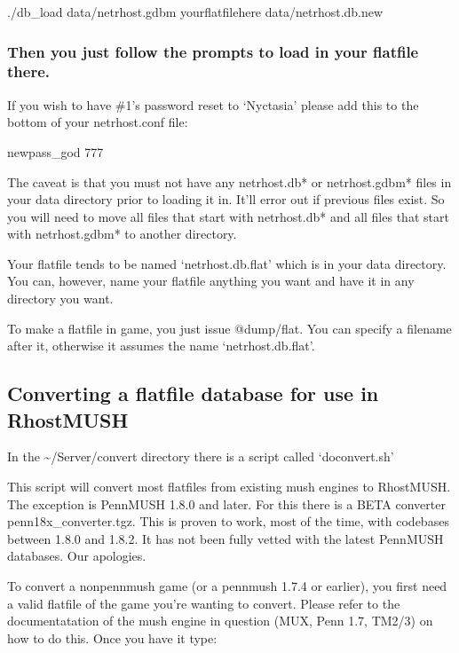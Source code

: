 \documentclass[letterpaper,10pt,english]{sphinxmanual}
\begin{document}
\sphinxAtStartPar
./db\_load data/netrhost.gdbm yourflatfilehere data/netrhost.db.new


\subsubsection{Then you just follow the prompts to load in your flatfile there.}
\label{\detokenize{database:then-you-just-follow-the-prompts-to-load-in-your-flatfile-there}}
\sphinxAtStartPar
If you wish to have \#1’s password reset to ‘Nyctasia’ please add this
to the bottom of your netrhost.conf file:

\sphinxAtStartPar
newpass\_god 777

\sphinxAtStartPar
The caveat is that you must not have any netrhost.db* or netrhost.gdbm* files
in your data directory prior to loading it in.  It’ll error out if previous
files exist.  So you will need to move all files that start with netrhost.db*
and all files that start with netrhost.gdbm* to another directory.

\sphinxAtStartPar
Your flatfile tends to be named ‘netrhost.db.flat’ which is in your data
directory.  You can, however, name your flatfile anything you want and have
it in any directory you want.

\sphinxAtStartPar
To make a flatfile in game, you just issue @dump/flat.  You can specify
a filename after it, otherwise it assumes the name ‘netrhost.db.flat’.


\subsection{Converting a flatfile database for use in RhostMUSH}
\label{\detokenize{database:converting-a-flatfile-database-for-use-in-rhostmush}}
\sphinxAtStartPar
In the \textasciitilde{}/Server/convert directory there is a script called ‘doconvert.sh’

\sphinxAtStartPar
This script will convert most flatfiles from existing mush engines to
RhostMUSH.  The exception is PennMUSH 1.8.0 and later.  For this there is a
BETA converter penn18x\_converter.tgz.  This is proven to work, most of the time,
with codebases between 1.8.0 and 1.8.2.  It has not been fully vetted with
the latest PennMUSH databases.  Our apologies.

\sphinxAtStartPar
To convert a non\sphinxhyphen{}pennmush game (or a pennmush 1.7.4 or earlier), you first
need a valid flatfile of the game you’re wanting to convert.  Please refer
to the documentatation of the mush engine in question (MUX, Penn 1.7, TM2/3)
on how to do this.  Once you have it type:
\end{document}
